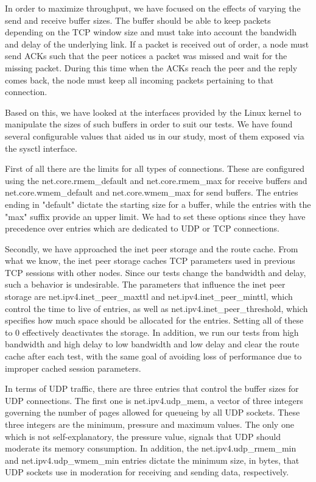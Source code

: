 
In order to maximize throughput, we have focused on the effects of varying the
send and receive buffer sizes. The buffer should be able to keep packets
depending on the TCP window size and must take into account the bandwidh and
delay of the underlying link. If a packet is received out of order, a node
must send ACKs such that the peer notices a packet was missed and wait for the
missing packet. During this time when the ACKs reach the peer and the reply
comes back, the node must keep all incoming packets pertaining to that
connection.

Based on this, we have looked at the interfaces provided by the Linux kernel
to manipulate the sizes of such buffers in order to suit our tests. We have
found several configurable values that aided us in our study, most of them
exposed via the sysctl interface.

First of all there are the limits for all types of connections. These are
configured using the net.core.rmem_default and net.core.rmem_max for receive
buffers and net.core.wmem_default and net.core.wmem_max for send buffers. The
entries ending in "default" dictate the starting size for a buffer, while the
entries with the "max" suffix provide an upper limit. We had to set these
options since they have precedence over entries which are dedicated to UDP or
TCP connections.

Secondly, we have approached the inet peer storage and the route cache. From
what we know, the inet peer storage caches TCP parameters used in previous TCP
sessions with other nodes. Since our tests change the bandwidth and delay,
such a behavior is undesirable. The parameters that influence the inet peer
storage are net.ipv4.inet_peer_maxttl and net.ipv4.inet_peer_minttl, which
control the time to live of entries, as well as net.ipv4.inet_peer_threshold,
which specifies how much space should be allocated for the entries. Setting
all of these to 0 effectively deactivates the storage. In addition, we run our
tests from high bandwidth and high delay to low bandwidth and low delay and
clear the route cache after each test, with the same goal of avoiding loss of
performance due to improper cached session parameters.

In terms of UDP traffic, there are three entries that control the buffer sizes
for UDP connections. The first one is net.ipv4.udp_mem, a vector of three
integers governing the number of pages allowed for queueing by all UDP
sockets. These three integers are the minimum, pressure and maximum values.
The only one which is not self-explanatory, the pressure value, signals that
UDP should moderate its memory consumption. In addition, the
net.ipv4.udp_rmem_min and net.ipv4.udp_wmem_min entries dictate the minimum
size, in bytes, that UDP sockets use in moderation for receiving and sending
data, respectively.


